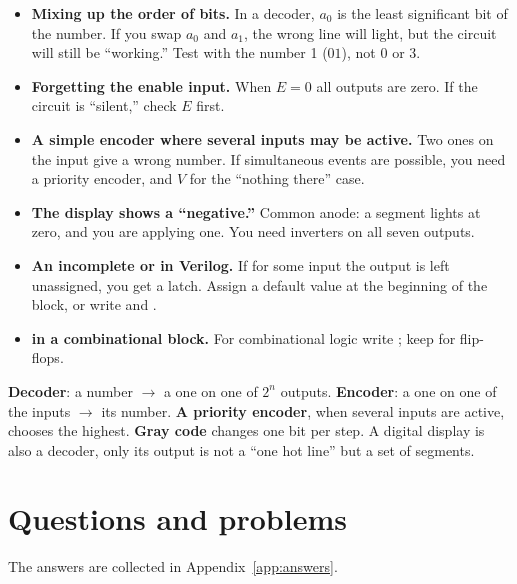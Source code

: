 \begin{warnbox}
\begin{itemize}
  \item \textbf{Mixing up the order of bits.} In a decoder, $a_0$ is the least significant
        bit of the number. If you swap $a_0$ and $a_1$, the wrong line will light, but the
        circuit will still be ``working.'' Test with the number 1 ($01$), not 0 or 3.
  \item \textbf{Forgetting the enable input.} When $E=0$ all outputs are zero.
        If the circuit is ``silent,'' check $E$ first.
  \item \textbf{A simple encoder where several inputs may be active.}
        Two ones on the input give a wrong number. If simultaneous events
        are possible, you need a priority encoder, and $V$ for the ``nothing there'' case.
  \item \textbf{The display shows a ``negative.''} Common anode: a segment
        lights at zero, and you are applying one. You need inverters on all seven
        outputs.
  \item \textbf{An incomplete  or  in Verilog.} If for some
        input the output is left unassigned, you get a latch. Assign a default
        value at the beginning of the  block, or write
         and .
  \item \textbf{\code{<=} in a combinational block.} For combinational
        logic write \code{=}; keep \code{<=} for flip-flops.
\end{itemize}
\end{warnbox}

\begin{ideabox}
\textbf{Decoder}: a number $\to$ a one on one of $2^n$ outputs.
\textbf{Encoder}: a one on one of the inputs $\to$ its number.
\textbf{A priority encoder}, when several inputs are active, chooses the highest.
\textbf{Gray code} changes one bit per step. A digital display is also a
decoder, only its output is not a ``one hot line'' but a set of segments.
\end{ideabox}

\section{Questions and problems}
\label{sec:tasks-coders}

The answers are collected in Appendix~\ref{app:answers}.

